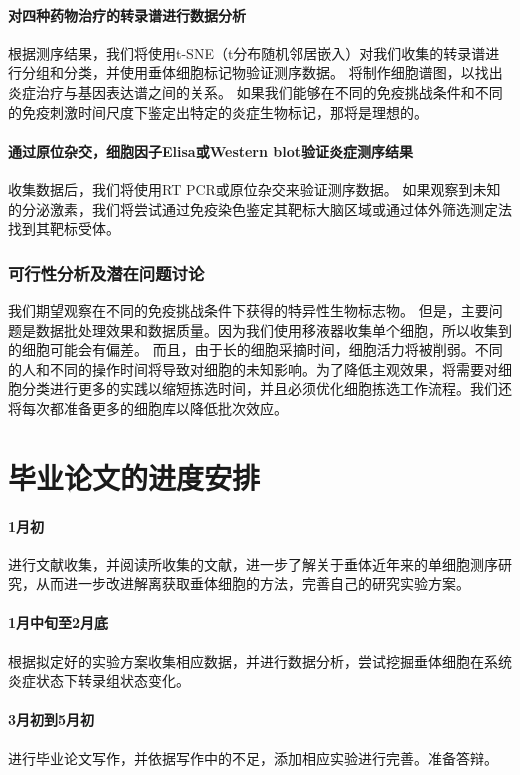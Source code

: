 \documentclass[class = opening]{whuthesis}
\begin{document}
\paragraph{对四种药物治疗的转录谱进行数据分析}
  根据测序结果，我们将使用t-SNE（t分布随机邻居嵌入）对我们收集的转录谱进行分组和分类，并使用垂体细胞标记物验证测序数据。 将制作细胞谱图，以找出炎症治疗与基因表达谱之间的关系。 如果我们能够在不同的免疫挑战条件和不同的免疫刺激时间尺度下鉴定出特定的炎症生物标记，那将是理想的。
\paragraph{通过原位杂交，细胞因子Elisa或Western blot验证炎症测序结果}
  收集数据后，我们将使用RT PCR或原位杂交来验证测序数据。 如果观察到未知的分泌激素，我们将尝试通过免疫染色鉴定其靶标大脑区域或通过体外筛选测定法找到其靶标受体。

\subsubsection{可行性分析及潜在问题讨论}
  我们期望观察在不同的免疫挑战条件下获得的特异性生物标志物。 但是，主要问题是数据批处理效果和数据质量。因为我们使用移液器收集单个细胞，所以收集到的细胞可能会有偏差。 而且，由于长的细胞采摘时间，细胞活力将被削弱。不同的人和不同的操作时间将导致对细胞的未知影响。为了降低主观效果，将需要对细胞分类进行更多的实践以缩短拣选时间，并且必须优化细胞拣选工作流程。我们还将每次都准备更多的细胞库以降低批次效应。

\section{毕业论文的进度安排}
\paragraph{1月初}
  进行文献收集，并阅读所收集的文献，进一步了解关于垂体近年来的单细胞测序研究，从而进一步改进解离获取垂体细胞的方法，完善自己的研究实验方案。
\paragraph{1月中旬至2月底}
  根据拟定好的实验方案收集相应数据，并进行数据分析，尝试挖掘垂体细胞在系统炎症状态下转录组状态变化。
\paragraph{3月初到5月初}
  进行毕业论文写作，并依据写作中的不足，添加相应实验进行完善。准备答辩。

\nocite{*}
\makebibliography
\end{document}
